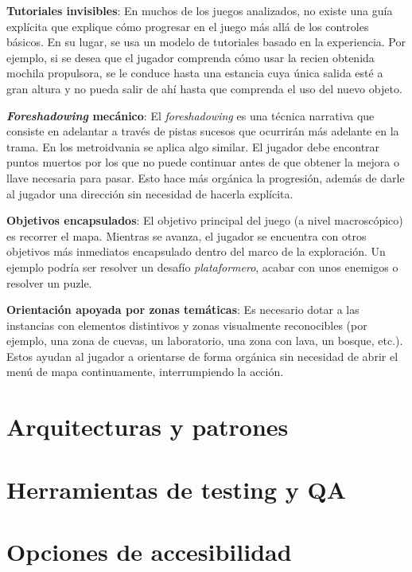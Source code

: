 \textbf{Tutoriales invisibles}: En muchos de los juegos analizados, no existe una guía explícita que explique cómo progresar en el juego más allá de los controles básicos. En su lugar, se usa un modelo de tutoriales basado en la experiencia. Por ejemplo, si se desea que el jugador comprenda cómo usar la recien obtenida mochila propulsora, se le conduce hasta una estancia cuya única salida esté a gran altura y no pueda salir de ahí hasta que comprenda el uso del nuevo objeto.


\textbf{\textit{Foreshadowing} mecánico}: El \textit{foreshadowing} es una técnica narrativa que consiste en adelantar a través de pistas sucesos que ocurrirán más adelante en la trama. En los metroidvania se aplica algo similar. El jugador debe encontrar puntos muertos por los que no puede continuar antes de que obtener la mejora o llave necesaria para pasar. Esto hace más orgánica la progresión, además de darle al jugador una dirección sin necesidad de hacerla explícita.


\textbf{Objetivos encapsulados}: El objetivo principal del juego (a nivel macroscópico) es recorrer el mapa. Mientras se avanza, el jugador se encuentra con otros objetivos más inmediatos encapsulado dentro del marco de la exploración. Un ejemplo podría ser resolver un desafío \textit{plataformero}, acabar con unos enemigos o resolver un puzle. 


\textbf{Orientación apoyada por zonas temáticas}: Es necesario dotar a las instancias con elementos distintivos y zonas visualmente reconocibles (por ejemplo, una zona de cuevas, un laboratorio, una zona con lava, un bosque, etc.). Estos ayudan al jugador a orientarse de forma orgánica sin necesidad de abrir el menú de mapa continuamente, interrumpiendo la acción.

\section{Arquitecturas y patrones}

\section{Herramientas de testing y QA}

\section{Opciones de accesibilidad}